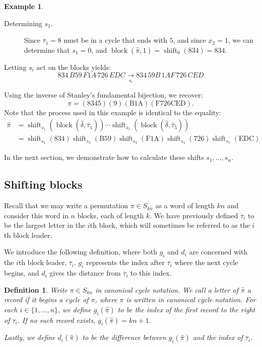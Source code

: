\documentclass{article}
\numberwithin{theorem}{section}
\newtheorem{definition}[theorem]{Definition}
\theoremstyle{definition}
\newtheorem{example}{Example}
\newcommand\pihat{\hat{\pi}}
\newcommand{\shift}{\operatorname{shift}}
\newcommand{\shiftBlock}[1]{\shift_{s_{#1}}\!\!\left(\block(\hat\delta, \hat\tau_{#1})\right)}
\newcommand{\block}{\operatorname{block}}
\begin{document}
\begin{example}
\begin{description}
        \item[Determining $s_1$.]
        Since $\overline\tau_1 = 8$ must be in a cycle that ends with $5$, and since $x_2 = 1$, we can determine that $s_1 = 0$, and \(\block(\pihat, 1) = \shift_0(\mathrm{834}) = \mathrm{834}\).
    \end{description}

    Letting $s_i$ act on the blocks yields:
    \[834\,B59\,F1A\,726\,EDC\xrightarrow[s_i]{} 834\,59B\,1AF\,726\,CED\]

    Using the inverse of Stanley's fundamental bijection, we recover: \[
        \boxed{\pi = \mathrm{(8345)(9)(B1A)(F726CED)}}.
    \]
    Note that the process used in this example is identical to the equality:
    \begin{align*}
        \hat\pi &= \shiftBlock{1} \cdots \shiftBlock{5} \\
                &= \shift_{s_1}(\mathrm{834})\shift_{s_2}(\mathrm{B59})\shift_{s_3}(\mathrm{F1A})\shift_{s_4}(\mathrm{726})\shift_{s_5}(\mathrm{EDC})
    \end{align*}
\end{example}

In the next section, we demonstrate how to calculate these shifts $s_1,\dots,s_n$.

\subsection{Shifting blocks}
Recall that we may write a permutation $\pi\in S_{kn}$ as a word of length $kn$ and consider this word in $n$ blocks, each of length $k$. We have previously defined $\overline{\tau}_i$ to be the largest letter in the $i$th block, which will sometimes be referred to as the $i$th block leader.

We introduce the following definition, where both $g_i$ and $d_i$ are concerned with the $i$th block leader, $\overline{\tau}_i$. $g_i$ represents the index after $\overline{\tau}_i$ where the next cycle begins, and $d_i$ gives the distance from $\overline{\tau}_i$ to this index.

\begin{definition}
    Write $\pi\in S_{kn}$ in canonical cycle notation. We call a letter of $\hat\pi$ a record if it begins a cycle of $\pi$, where $\pi$ is written in canonical cycle notation. For each $i\in \{1,\dots,n\}$, we define $g_i(\hat\pi)$ to be the index of the first record to the right of $\overline{\tau}_i$. If no such record exists, $g_i(\hat\pi) = kn+1$.

    Lastly, we define $d_i(\hat\pi)$ to be the difference between   $g_i(\hat\pi)$ and the index of $\overline{\tau}_i$.
\end{definition}
\end{document}
